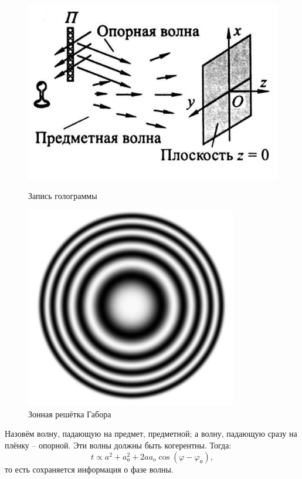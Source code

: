 \documentclass[a4paper]{article}
\begin{document}
\begin{figure}[tbp]	
	\centering
	\begin{minipage}{0.49\linewidth}
		\centering
		\includegraphics[width=0.8\linewidth]{Screenshot_4}
		\caption{Запись голограммы}
		\label{fig:screenshot4}
	\end{minipage}
	\begin{minipage}{0.49\linewidth}
		\centering
		\includegraphics[width=0.8\linewidth]{Screenshot_1}
		\caption{Зонная решётка Габора}
		\label{fig:screenshot1}
	\end{minipage}
\end{figure}

Назовём волну, падающую на предмет, предметной; а волну, падающую сразу на плёнку -- опорной. Эти волны должны быть когерентны. Тогда:
\begin{equation*}\label{key}
	t \propto a^2+a_о^2+2 a a_o \cos (\varphi - \varphi_о),
\end{equation*}
то есть сохраняется информация о фазе волны.
\end{document}
